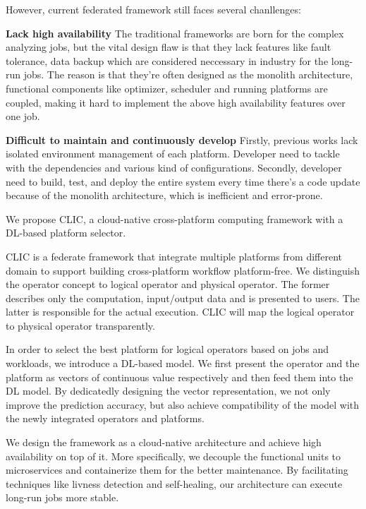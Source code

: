 However, current federated framework still faces several chanllenges:



\textbf{Lack high availability} The traditional frameworks are born for the complex analyzing jobs, but the vital design flaw is that they lack features like fault tolerance, data backup which are considered neccessary in industry for the long-run jobs. The reason is that they're often designed as the monolith architecture, functional components like optimizer, scheduler and running platforms are coupled, making it hard to implement the above high availability features over one job.

\textbf{Difficult to maintain and continuously develop} Firstly, previous works lack isolated environment management of each platform. Developer need to tackle with the dependencies and various kind of configurations. Secondly, developer need to build, test, and deploy the entire system every time there's a code update because of the monolith architecture, which is inefficient and error-prone.

We propose CLIC, a cloud-native cross-platform computing framework with a DL-based platform selector.

CLIC is a federate framework that integrate multiple platforms from different domain to support building cross-platform workflow platform-free. We distinguish the operator concept to logical operator and physical operator. The former describes only the computation, input/output data and is presented to users. The latter is responsible for the actual execution. CLIC will map the logical operator to physical operator transparently.

In order to select the best platform for logical operators based on jobs and workloads, we introduce a DL-based model. We first present the operator and the platform as vectors of continuous value respectively and then feed them into the DL model. By dedicatedly designing the vector representation, we not only improve the prediction accuracy, but also achieve compatibility of the model with the newly integrated operators and platforms.

We design the framework as a cloud-native architecture and achieve high availability on top of it. More specifically, we decouple the functional units to microservices and containerize them for the better maintenance. By facilitating techniques like livness detection and self-healing, our architecture can execute long-run jobs more stable.


